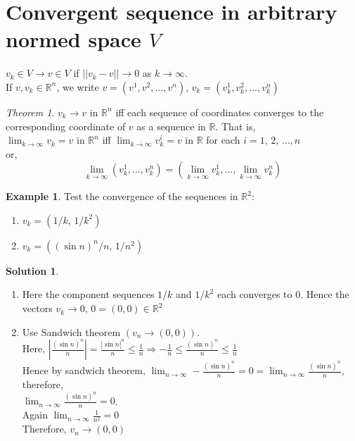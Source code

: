 \documentclass[12pt,oneside,a4paper]{book}
\newcommand{\R}{\mathds{R}}
\newcommand{\n}[1]{1,\,2,\,\dots,#1}
\newcommand{\abs}[1]{\left\vert#1\right\vert}
\newcommand{\norm}[1]{\left\vert\left\vert#1\right\vert\right\vert}
\theoremstyle{remark}
\newtheorem{thm}{Theorem}[section]
\theoremstyle{definition}
\newtheorem*{ex}{Example}
\newtheorem*{soln}{Solution}
\begin{document}
\section{Convergent sequence in arbitrary normed space $ V $}   
$ v_k\in V\to v\in V $ if $ \norm{v_k-v}\to 0 $ as $ k\to \infty $.\\
If $ v,v_k\in \R^n $, we write $ v=(v^1,v^2,\dots,v^n),\,v_k=(v^1_k,v^2_k,\dots,v_k^n) $
\begin{thm}
    $ v_k\to v $ in $ \R^n $ iff each sequence of coordinates converges to the corresponding coordinate of $ v $ as a sequence in $ \R $. That is,\\
    $ \lim_{k\to \infty} v_k=v$ in $ \R^n $ iff $ \lim_{k\to \infty} v_k^i=v $ in $ \R $ for each $ i=\n{n} $\\
    or,\[\lim_{k\to \infty} (v_k^1,\dots,v_k^n)= \left(\lim_{k\to \infty}v_k^1,\dots,\lim_{k\to \infty}v_k^n\right)\]
\end{thm}
\begin{ex}
    Test the convergence of the sequences in $ \R^2 $:
    \begin{enumerate}[label=(\roman*)]
        \item $ v_k=(1/k,\,1/k^2) $
        \item $ v_k=\left((\sin n)^n /n,\,1/n^2\right) $
    \end{enumerate}
\end{ex}
\begin{soln}
    \hfill
    \begin{enumerate}[label=(\roman*)]
        \item Here the component sequences $ 1/k $ and $ 1/k^2 $ each converges to 0. Hence the vectors $ v_k\to0,\, 0=(0,0)\in\R^2$
        \item Use Sandwich theorem $ \left(v_n\to (0,0)\right) $.\\
        Here, $ \abs{\frac{(\sin n)^n}{n}}=\frac{\abs{\sin n}^n}{n}\leq \frac{1}{n}\Rightarrow -\frac{1}{n}\leq \frac{(\sin n)^n}{n} \leq \frac{1}{n}$\\
        Hence by sandwich theorem, $ \lim_{n\to\infty} -\frac{(\sin n)^n}{n}=0=\lim_{n\to\infty}\frac{(\sin n)^n}{n}$, therefore,\\
        $ \lim_{n\to\infty}\frac{(\sin n)^n}{n}=0 $.\\
        Again $ \lim_{n\to\infty} \frac{1}{n^2}=0 $\\
        Therefore, $ v_n\to (0,0) $
    \end{enumerate}
\end{soln}
\end{document}

